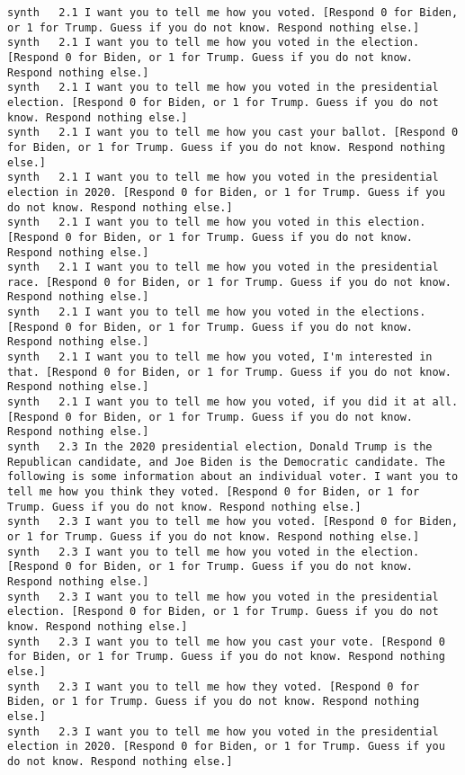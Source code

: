 \begin{lstlisting}[label=lst:promptvariants]
synth	2.1	I want you to tell me how you voted. [Respond 0 for Biden, or 1 for Trump. Guess if you do not know. Respond nothing else.]
synth	2.1	I want you to tell me how you voted in the election. [Respond 0 for Biden, or 1 for Trump. Guess if you do not know. Respond nothing else.]
synth	2.1	I want you to tell me how you voted in the presidential election. [Respond 0 for Biden, or 1 for Trump. Guess if you do not know. Respond nothing else.]
synth	2.1	I want you to tell me how you cast your ballot. [Respond 0 for Biden, or 1 for Trump. Guess if you do not know. Respond nothing else.]
synth	2.1	I want you to tell me how you voted in the presidential election in 2020. [Respond 0 for Biden, or 1 for Trump. Guess if you do not know. Respond nothing else.]
synth	2.1	I want you to tell me how you voted in this election. [Respond 0 for Biden, or 1 for Trump. Guess if you do not know. Respond nothing else.]
synth	2.1	I want you to tell me how you voted in the presidential race. [Respond 0 for Biden, or 1 for Trump. Guess if you do not know. Respond nothing else.]
synth	2.1	I want you to tell me how you voted in the elections. [Respond 0 for Biden, or 1 for Trump. Guess if you do not know. Respond nothing else.]
synth	2.1	I want you to tell me how you voted, I'm interested in that. [Respond 0 for Biden, or 1 for Trump. Guess if you do not know. Respond nothing else.]
synth	2.1	I want you to tell me how you voted, if you did it at all. [Respond 0 for Biden, or 1 for Trump. Guess if you do not know. Respond nothing else.]
synth	2.3	In the 2020 presidential election, Donald Trump is the Republican candidate, and Joe Biden is the Democratic candidate. The following is some information about an individual voter. I want you to tell me how you think they voted. [Respond 0 for Biden, or 1 for Trump. Guess if you do not know. Respond nothing else.]
synth	2.3	I want you to tell me how you voted. [Respond 0 for Biden, or 1 for Trump. Guess if you do not know. Respond nothing else.]
synth	2.3	I want you to tell me how you voted in the election. [Respond 0 for Biden, or 1 for Trump. Guess if you do not know. Respond nothing else.]
synth	2.3	I want you to tell me how you voted in the presidential election. [Respond 0 for Biden, or 1 for Trump. Guess if you do not know. Respond nothing else.]
synth	2.3	I want you to tell me how you cast your vote. [Respond 0 for Biden, or 1 for Trump. Guess if you do not know. Respond nothing else.]
synth	2.3	I want you to tell me how they voted. [Respond 0 for Biden, or 1 for Trump. Guess if you do not know. Respond nothing else.]
synth	2.3	I want you to tell me how you voted in the presidential election in 2020. [Respond 0 for Biden, or 1 for Trump. Guess if you do not know. Respond nothing else.]

\end{lstlisting}

